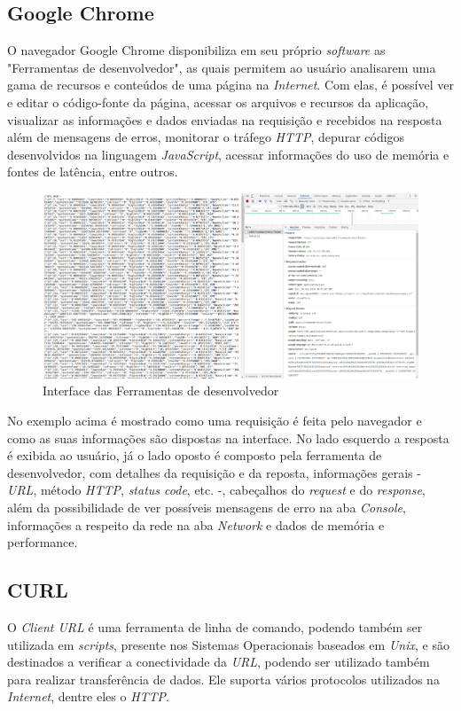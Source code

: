 \subsection{Google Chrome}
O navegador Google Chrome disponibiliza em seu próprio \textit{software} as "Ferramentas de desenvolvedor", as quais permitem ao usuário analisarem uma gama de recursos e conteúdos de uma página na \textit{Internet}. Com elas, é possível ver e editar o código-fonte da página, acessar os arquivos e recursos da aplicação, visualizar as informações e dados enviadas na requisição e recebidos na resposta além de mensagens de erros, monitorar o tráfego \textit{HTTP}, depurar códigos desenvolvidos na linguagem \textit{JavaScript}, acessar informações do uso de memória e fontes de latência, entre outros.

\begin{figure}[h]
	\centering
	\includegraphics[width=\textwidth]{imagens/google1.png}
	\caption{Interface das Ferramentas de desenvolvedor}
	\label{fig:google}
\end{figure}

No exemplo acima é mostrado como uma requisição é feita pelo navegador e como as suas informações são dispostas na interface. No lado esquerdo a resposta é exibida ao usuário, já o lado oposto é composto pela ferramenta de desenvolvedor, com detalhes da requisição e da reposta, informações gerais - \textit{URL}, método \textit{HTTP}, \textit{status code}, etc. -, cabeçalhos do \textit{request} e do \textit{response}, além da possibilidade de ver possíveis mensagens de erro na aba \textit{Console}, informações a respeito da rede na aba \textit{Network} e dados de memória e performance.

\subsection{CURL}
O \textit{Client URL} é uma ferramenta de linha de comando, podendo também ser utilizada em \textit{scripts}, presente nos Sistemas Operacionais baseados em \textit{Unix}, e são destinados a verificar a conectividade da \textit{URL}, podendo ser utilizado também para realizar transferência de dados. Ele suporta vários protocolos utilizados na \textit{Internet}, dentre eles o \textit{HTTP}.

